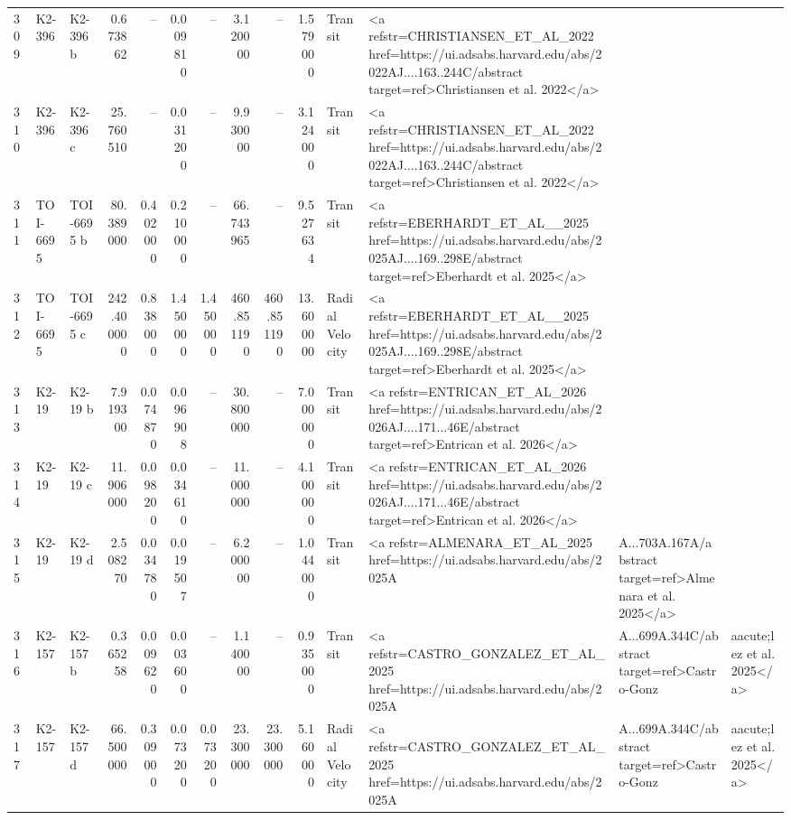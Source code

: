 \begin{tabular}{lllrrrrrrrll}
309 & K2-396 & K2-396 b & 0.673862 & -- & 0.009810 & -- & 3.120000 & -- & 1.579000 & Transit & <a refstr=CHRISTIANSEN_ET_AL_2022 href=https://ui.adsabs.harvard.edu/abs/2022AJ....163..244C/abstract target=ref>Christiansen et al. 2022</a> \\
310 & K2-396 & K2-396 c & 25.760510 & -- & 0.031200 & -- & 9.930000 & -- & 3.124000 & Transit & <a refstr=CHRISTIANSEN_ET_AL_2022 href=https://ui.adsabs.harvard.edu/abs/2022AJ....163..244C/abstract target=ref>Christiansen et al. 2022</a> \\
311 & TOI-6695 & TOI-6695 b & 80.389000 & 0.402000 & 0.210000 & -- & 66.743965 & -- & 9.527634 & Transit & <a refstr=EBERHARDT_ET_AL__2025 href=https://ui.adsabs.harvard.edu/abs/2025AJ....169..298E/abstract target=ref>Eberhardt et al. 2025</a> \\
312 & TOI-6695 & TOI-6695 c & 242.400000 & 0.838000 & 1.450000 & 1.450000 & 460.851190 & 460.851190 & 13.600000 & Radial Velocity & <a refstr=EBERHARDT_ET_AL__2025 href=https://ui.adsabs.harvard.edu/abs/2025AJ....169..298E/abstract target=ref>Eberhardt et al. 2025</a> \\
313 & K2-19 & K2-19 b & 7.919300 & 0.074870 & 0.096908 & -- & 30.800000 & -- & 7.000000 & Transit & <a refstr=ENTRICAN_ET_AL_2026 href=https://ui.adsabs.harvard.edu/abs/2026AJ....171...46E/abstract target=ref>Entrican et al. 2026</a> \\
314 & K2-19 & K2-19 c & 11.906000 & 0.098200 & 0.034610 & -- & 11.000000 & -- & 4.100000 & Transit & <a refstr=ENTRICAN_ET_AL_2026 href=https://ui.adsabs.harvard.edu/abs/2026AJ....171...46E/abstract target=ref>Entrican et al. 2026</a> \\
315 & K2-19 & K2-19 d & 2.508270 & 0.034780 & 0.019507 & -- & 6.200000 & -- & 1.044000 & Transit & <a refstr=ALMENARA_ET_AL_2025 href=https://ui.adsabs.harvard.edu/abs/2025A&A...703A.167A/abstract target=ref>Almenara et al. 2025</a> \\
316 & K2-157 & K2-157 b & 0.365258 & 0.009620 & 0.003600 & -- & 1.140000 & -- & 0.935000 & Transit & <a refstr=CASTRO_GONZALEZ_ET_AL_2025 href=https://ui.adsabs.harvard.edu/abs/2025A&A...699A.344C/abstract target=ref>Castro-Gonz&aacute;lez et al. 2025</a> \\
317 & K2-157 & K2-157 d & 66.500000 & 0.309000 & 0.073200 & 0.073200 & 23.300000 & 23.300000 & 5.160000 & Radial Velocity & <a refstr=CASTRO_GONZALEZ_ET_AL_2025 href=https://ui.adsabs.harvard.edu/abs/2025A&A...699A.344C/abstract target=ref>Castro-Gonz&aacute;lez et al. 2025</a> \\

\end{tabular}
